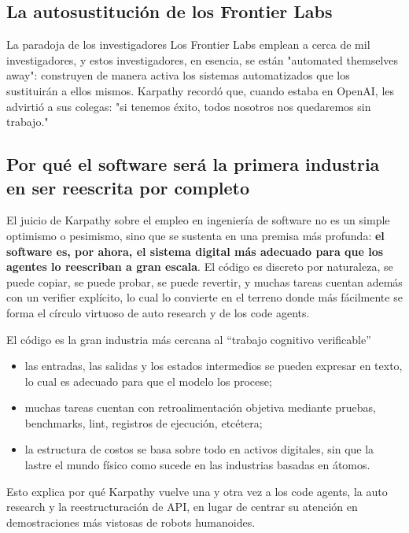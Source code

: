 \subsection{La autosustitución de los Frontier Labs}

\begin{warningbox}{La paradoja de los investigadores}
Los Frontier Labs emplean a cerca de mil investigadores, y estos investigadores, en esencia, se están "automated themselves away": construyen de manera activa los sistemas automatizados que los sustituirán a ellos mismos. Karpathy recordó que, cuando estaba en OpenAI, les advirtió a sus colegas: "si tenemos éxito, todos nosotros nos quedaremos sin trabajo."
\end{warningbox}

\subsection{Por qué el software será la primera industria en ser reescrita por completo}
El juicio de Karpathy sobre el empleo en ingeniería de software no es un simple optimismo o pesimismo, sino que se sustenta en una premisa más profunda: \textbf{el software es, por ahora, el sistema digital más adecuado para que los agentes lo reescriban a gran escala}. El código es discreto por naturaleza, se puede copiar, se puede probar, se puede revertir, y muchas tareas cuentan además con un verifier explícito, lo cual lo convierte en el terreno donde más fácilmente se forma el círculo virtuoso de auto research y de los code agents.

\begin{importantbox}{El código es la gran industria más cercana al ``trabajo cognitivo verificable''}
\begin{itemize}
    \item las entradas, las salidas y los estados intermedios se pueden expresar en texto, lo cual es adecuado para que el modelo los procese;
    \item muchas tareas cuentan con retroalimentación objetiva mediante pruebas, benchmarks, lint, registros de ejecución, etcétera;
    \item la estructura de costos se basa sobre todo en activos digitales, sin que la lastre el mundo físico como sucede en las industrias basadas en átomos.
\end{itemize}
Esto explica por qué Karpathy vuelve una y otra vez a los code agents, la auto research y la reestructuración de API, en lugar de centrar su atención en demostraciones más vistosas de robots humanoides.
\end{importantbox}

